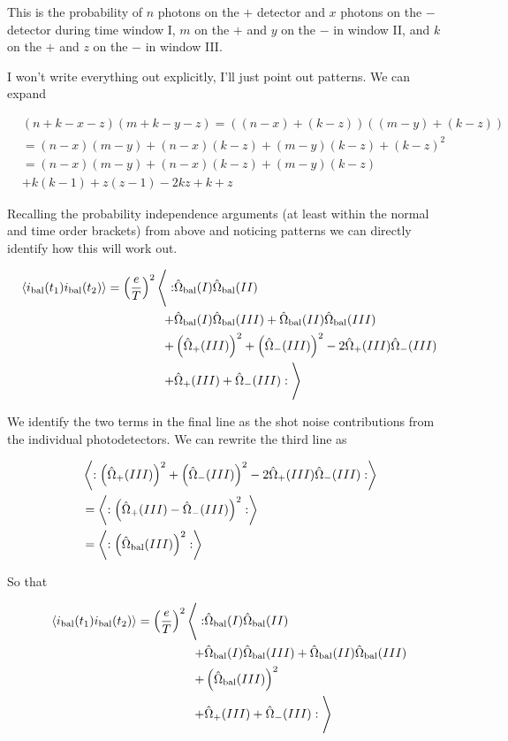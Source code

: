 \documentclass[12pt]{article}
\begin{document}
This is the probability of $n$ photons on the $+$ detector and $x$ photons on the $-$ detector during time window I, $m$ on the $+$ and $y$ on the $-$ in window II, and $k$ on the $+$ and $z$ on the $-$ in window III.

I won't write everything out explicitly, I'll just point out patterns. We can expand

\begin{align}
&(n+k-x-z)(m+k-y-z) = ((n-x) + (k-z))((m-y) + (k-z)) \\
&=(n-x)(m-y) + (n-x)(k-z) + (m-y)(k-z) + (k-z)^2\\
&= (n-x)(m-y) + (n-x)(k-z) + (m-y)(k-z)\\
&+ k(k-1) + z(z-1) - 2 kz + k + z
\end{align}

Recalling the probability independence arguments (at least within the normal and time order brackets) from above and noticing patterns we can directly identify how this will work out.

\begin{align}
\Braket{i_{\text{bal}}(t_1)i_{\text{bal}}(t_2)} = \left(\frac{e}{T}\right)^2 \Bigg \langle: &\hat{\Omega}_{\text{bal}}(I) \hat{\Omega}_{\text{bal}}(II)\\
+ &\hat{\Omega}_{\text{bal}}(I) \hat{\Omega}_{\text{bal}}(III) + \hat{\Omega}_{\text{bal}}(II) \hat{\Omega}_{\text{bal}}(III)\\
+ &\left(\hat{\Omega}_+(III)\right)^2 + \left(\hat{\Omega}_-(III)\right)^2 - 2 \hat{\Omega}_+(III) \hat{\Omega}_-(III)\\
+&\hat{\Omega}_+(III) + \hat{\Omega}_-(III)
:\Bigg \rangle
\end{align}

We identify the two terms in the final line as the shot noise contributions from the individual photodetectors. We can rewrite the third line as

\begin{align}
&\Braket{:\left(\hat{\Omega}_+(III)\right)^2 + \left(\hat{\Omega}_-(III)\right)^2 - 2 \hat{\Omega}_+(III) \hat{\Omega}_-(III):}\\
&= \Braket{:\left(\hat{\Omega}_+(III) - \hat{\Omega}_-(III)\right)^2 :}\\
&= \Braket{:\left(\hat{\Omega}_{\text{bal}}(III) \right)^2 :}
\end{align}

So that

\begin{align}
\Braket{i_{\text{bal}}(t_1)i_{\text{bal}}(t_2)} = \left(\frac{e}{T}\right)^2 \Bigg \langle: &\hat{\Omega}_{\text{bal}}(I) \hat{\Omega}_{\text{bal}}(II)\\
+ &\hat{\Omega}_{\text{bal}}(I) \hat{\Omega}_{\text{bal}}(III) + \hat{\Omega}_{\text{bal}}(II) \hat{\Omega}_{\text{bal}}(III)\\
+ &\left(\hat{\Omega}_{\text{bal}}(III) \right)^2\\
+&\hat{\Omega}_+(III) + \hat{\Omega}_-(III)
:\Bigg \rangle
\end{align}
\end{document}
